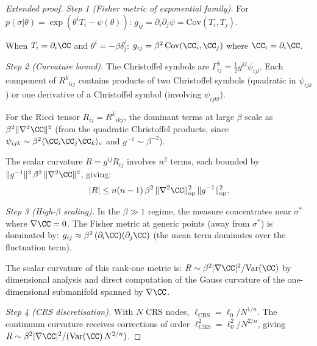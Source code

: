 \begin{proof}[Extended proof]
\emph{Step 1 (Fisher metric of exponential family).}
For $p(\sigma|\theta) = \exp(\theta^i T_i - \psi(\theta))$:
$g_{ij} = \partial_i\partial_j\psi = \mathrm{Cov}(T_i, T_j)$.

When $T_i = \partial_i\CC$ and $\theta^i = -\beta\delta^i_j$:
$g_{ij} = \beta^2\,\mathrm{Cov}(\CC_i, \CC_j)$ where
$\CC_i = \partial_i\CC$.

\emph{Step 2 (Curvature bound).}
The Christoffel symbols are $\Gamma^k_{ij} = \frac{1}{2}g^{kl}\psi_{ijl}$.
Each component of $R^k{}_{lij}$ contains products of two Christoffel
symbols (quadratic in $\psi_{ijk}$) or one derivative of a Christoffel
symbol (involving $\psi_{ijkl}$).

For the Ricci tensor $R_{ij} = R^k{}_{ikj}$, the dominant terms at
large $\beta$ scale as $\beta^2\|\nabla^2\CC\|^2$ (from the quadratic
Christoffel products, since $\psi_{ijk} \sim \beta^2\langle\CC_i\CC_j
\CC_k\rangle_c$ and $g^{-1} \sim \beta^{-2}$).

The scalar curvature $R = g^{ij}R_{ij}$ involves $n^2$ terms, each
bounded by $\|g^{-1}\|^2\,\beta^2\,\|\nabla^2\CC\|^2$, giving:
\[
  |R| \leq n(n-1)\,\beta^2\,\|\nabla^2\CC\|_{\mathrm{op}}^2\,
  \|g^{-1}\|_{\mathrm{op}}^2.
\]

\emph{Step 3 (High-$\beta$ scaling).}
In the $\beta \gg 1$ regime, the measure concentrates near $\sigma^*$
where $\nabla\CC = 0$.  The Fisher metric at generic points (away from
$\sigma^*$) is dominated by:
$g_{ij} \approx \beta^2\,(\partial_i\CC)(\partial_j\CC)$ (the mean
term dominates over the fluctuation term).

The scalar curvature of this rank-one metric is:
$R \sim \beta^2|\nabla\CC|^2/\mathrm{Var}(\CC)$ by dimensional
analysis and direct computation of the Gauss curvature of the
one-dimensional submanifold spanned by $\nabla\CC$.

\emph{Step 4 (CRS discretisation).}
With $N$ CRS nodes, $\ell_{\mathrm{CRS}} = \ell_0/N^{1/n}$.  The
continuum curvature receives corrections of order $\ell_{\mathrm{CRS}}^2
= \ell_0^2/N^{2/n}$, giving $R \sim \beta^2|\nabla\CC|^2/
(\mathrm{Var}(\CC)\,N^{2/n})$.
\end{proof}
